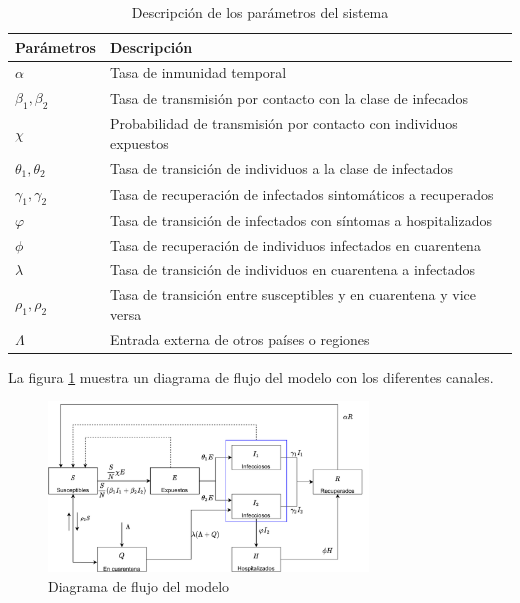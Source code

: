 \documentclass[conference]{IEEEtran}
\begin{document}
\begin{table}[h]
    \begin{tabular}{ll}
    \hline
    Parámetros            & Descripción                                                        \\ \hline
    $\alpha$              & Tasa de inmunidad temporal                                         \\ 
    $\beta_1, \beta_2$    & Tasa de transmisión por contacto con la clase de infecados         \\ 
    $\chi$                & Probabilidad de transmisión por contacto con individuos expuestos  \\ 
    $\theta_1 , \theta_2$ & Tasa de transición de individuos a la clase de infectados          \\ 
    $\gamma_1 , \gamma_2$ & Tasa de recuperación de infectados sintomáticos a recuperados      \\ 
    $\varphi$                & Tasa de transición de infectados con síntomas a hospitalizados     \\ 
    $\phi$                & Tasa de recuperación de individuos infectados en cuarentena        \\ 
    $\lambda$             & Tasa de transición de individuos en cuarentena a infectados        \\ 
    $\rho_1 , \rho_2$     & Tasa de transición entre susceptibles y en cuarentena y vice versa \\ 
    $\Lambda$             & Entrada externa de otros países o regiones                         \\ \hline
    \end{tabular}
    \caption{Descripción de los parámetros del sistema}
    \label{sys_pars}
\end{table}



La figura \ref{block_diagram} muestra un diagrama de flujo del modelo con los diferentes canales.

\begin{figure}[H]
    \centering
    \includegraphics[width=8.5cm]{../Figures/Model_flowchart.pdf}
    \caption{Diagrama de flujo del modelo}
    \label{block_diagram}
\end{figure}
\end{document}
